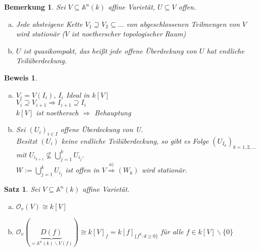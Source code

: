 \documentclass[a4paper,12pt]{report}
\theoremstyle{break}
\newtheorem{Satz}{Satz}
\newtheorem{Bem}[Def]{Bemerkung}
\theoremstyle{nonumberbreak}
\newtheorem{Bew}{Beweis}
\theoremstyle{nonumberplain}
\newcommand{\quot}[1]{\textrm{\glqq}{#1}\textrm{\grqq}}
\newcommand{\A}{\mathbb{A}}
\begin{document}
\begin{Bem}\label{7.5}\label{bem7.5}
Sei $V\subseteq \A^n(k)$ affine Variet\"at, $U\subseteq V$ offen.\begin{enumerate}[a)]
\item
	Jede absteigene Kette $V_1 \supseteq V_2 \subseteq \dots $ von abgeschlossenen Teilmengen von $V$ wird station\"ar (\quot{$V$ ist noetherscher topologischer Raum})
	
\item
	$U$ ist quasikompakt, das hei\ss t jede offene \"Uberdeckung von $U$ hat endliche Teil\"uberdeckung.
\end{enumerate}\end{Bem}

\begin{Bew}\begin{enumerate}[a)]
\item
$V_i=V(I_i)$, $I_i$ Ideal in $k[V]$\\
$V_i\supseteq V_{i+1} \Rightarrow I_{i+1} \supseteq I_i$\\
$k[V]$ ist noethersch $\Rightarrow $ Behauptung

\item\label{bem7.5b}
Sei $(U_i)_{i\in I}$ offene \"Uberdeckung von U.\\
Besitzt $(U_i)$ keine endliche Teil\"uberdeckung, so gibt es Folge $(U_{I_k})_{k=1,2,\dots }$ mit $U_{i_{k+1}} \nsubseteq \bigcup_{j=1}^k U_{i_j}.$\\
$W:= \bigcup_{j=1}^k U_{i_j}$ ist offen in $V \stackrel{a)}{\Rightarrow} (W_k)$ wird station\"ar.
\end{enumerate}\end{Bew}

\begin{Satz}\label{satz5}
Sei $V\subseteq\A^n(k)$ affine Variet\"at.\begin{enumerate}[a)]
\item\label{satz5a}
	$\mathcal O_v(V) \cong k[V]$

\item\label{satz5b}
	$\mathcal O_v(\underbrace{D(f)}_{=\A^n(k)\backslash V(f)}) \cong k[V]_f = k[f]_{\{f^d:d\ge 0\}}$
	f\"ur alle $f\in k[V]\backslash\{0\}$
\end{enumerate}\end{Satz}
\end{document}

